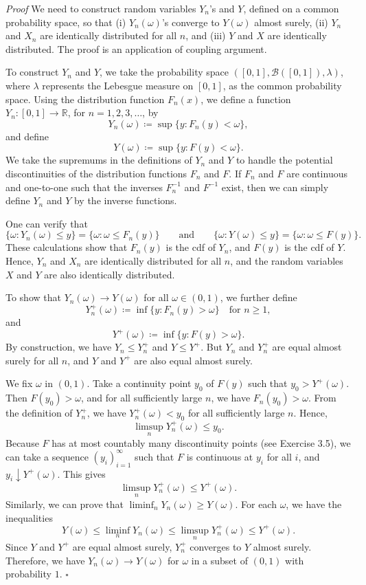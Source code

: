 \textit{Proof}
We need to construct random variables $Y_n$'s and $Y$, defined on a common probability space, so that (i) $Y_n(\omega)$'s converge to $Y(\omega)$ almost surely, (ii) $Y_n$ and $X_n$ are identically distributed for all $n$, and (iii) $Y$ and $X$ are identically distributed. The proof is an application of coupling argument.

To construct $Y_n$ and $Y$, we take the probability space $([0,1],\mathcal{B}([0,1]),\lambda)$, where $\lambda$ represents the Lebesgue measure on $[0,1]$, as the common probability space. Using the distribution function $F_n(x)$, we define a function $Y_n:[0,1]\to\mathbb{R}$, for $n=1,2,3,\ldots$, by
\[
Y_n(\omega)\coloneqq \sup\{y:F_n(y)<\omega\},
\tag{10.4}
\]
and define
\[
Y(\omega)\coloneqq \sup\{y:F(y)<\omega\}.
\tag{10.5}
\]
We take the supremums in the definitions of $Y_n$ and $Y$ to handle the potential discontinuities of the distribution functions $F_n$ and $F$. If $F_n$ and $F$ are continuous and one-to-one such that the inverses $F_n^{-1}$ and $F^{-1}$ exist, then we can simply define $Y_n$ and $Y$ by the inverse functions.

One can verify that
\[
\{\omega:Y_n(\omega)\leq y\}=\{\omega:\omega\leq F_n(y)\}
\qquad\text{and}\qquad
\{\omega:Y(\omega)\leq y\}=\{\omega:\omega\leq F(y)\}.
\]
These calculations show that $F_n(y)$ is the cdf of $Y_n$, and $F(y)$ is the cdf of $Y$. Hence, $Y_n$ and $X_n$ are identically distributed for all $n$, and the random variables $X$ and $Y$ are also identically distributed.

To show that $Y_n(\omega)\to Y(\omega)$ for all $\omega\in(0,1)$, we further define
\[
Y_n^+(\omega)\coloneqq \inf\{y:F_n(y)>\omega\}
\quad\text{for }n\geq 1,
\]
and
\[
Y^+(\omega)\coloneqq \inf\{y:F(y)>\omega\}.
\]
By construction, we have $Y_n\leq Y_n^+$ and $Y\leq Y^+$. But $Y_n$ and $Y_n^+$ are equal almost surely for all $n$, and $Y$ and $Y^+$ are also equal almost surely.

We fix $\omega$ in $(0,1)$. Take a continuity point $y_0$ of $F(y)$ such that $y_0>Y^+(\omega)$. Then $F(y_0)>\omega$, and for all sufficiently large $n$, we have $F_n(y_0)>\omega$. From the definition of $Y_n^+$, we have $Y_n^+(\omega)<y_0$ for all sufficiently large $n$. Hence,
\[
\limsup_n Y_n^+(\omega)\leq y_0.
\]
Because $F$ has at most countably many discontinuity points (see Exercise 3.5), we can take a sequence $(y_i)_{i=1}^{\infty}$ such that $F$ is continuous at $y_i$ for all $i$, and $y_i\downarrow Y^+(\omega)$. This gives
\[
\limsup_n Y_n^+(\omega)\leq Y^+(\omega).
\]
Similarly, we can prove that $\liminf_n Y_n(\omega)\geq Y(\omega)$. For each $\omega$, we have the inequalities
\[
Y(\omega)\leq \liminf_n Y_n(\omega)
\leq \limsup_n Y_n^+(\omega)\leq Y^+(\omega).
\]
Since $Y$ and $Y^+$ are equal almost surely, $Y_n^+$ converges to $Y$ almost surely. Therefore, we have $Y_n(\omega)\to Y(\omega)$ for $\omega$ in a subset of $(0,1)$ with probability $1$.
\hfill $\square$
